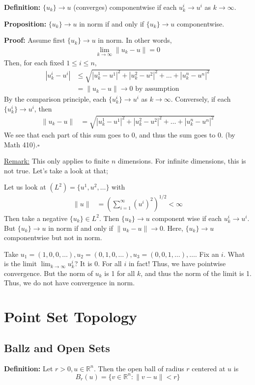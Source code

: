 \documentclass{article}
\newcommand*{\qed}{\hfill$\square$}%
\newcommand*{\txt}[1]{\text{ #1 }}%
\newcommand*{\rr}{\mathbb{R}}%
\begin{document}
\textbf{Definition:} $\{u_k\}\to u$ (converges) componentwise if each $u_k^i\to u^i$ as $k\to\infty$.

\textbf{Proposition:} $\{u_k\}\to u$ in norm if and only if $\{u_k\}\to u$ componentwise.

\textbf{Proof:} Assume first $\{u_k\}\to u$ in norm. In other words, \begin{align*}
    \lim_{k\to\infty}\|u_k-u\|=0
\end{align*}
Then, for each fixed $1\leq i\leq n$, \begin{align*}
    |u_k^i-u^i|&\leq\sqrt{|u_k^1-u^1|^2+|u_k^2-u^2|^2+\ldots+|u_k^n-u^n|^2} \\&= \|u_k-u\|\to 0\txt{by assumption}
\end{align*}
By the comparison principle, each $\{u_k^i\}\to u^i$ as $k\to\infty$. Conversely, if each $\{u_k^i\}\to u^i$, then \begin{align*}
    \|u_k-u\|&=\sqrt{|u_k^1-u^1|^2+|u_k^2-u^2|^2+\ldots+|u_k^n-u^n|^2}
\end{align*}
We see that each part of this sum goes to 0, and thus the sum goes to 0. (by Math 410).\qed

\underline{Remark:} This only applies to finite $n$ dimensions. For infinite dimensions, this is not true. Let's take a look at that;

Let us look at $(\mathit{L}^2)=\{u^1, u^2, \dots\}$ with \begin{align*}
    \|u\|&=(\sum_{i=1}^{\infty}(u^i)^2)^{1/2}<\infty
\end{align*}
Then take a negative $\{u_k\}\in \mathit{L}^2$. Then $\{u_k\}\to u$ component wise if each $u_k^i\to u^i$. But $\{u_k\}\to u$ in norm if and only if $\|u_k-u\|\to 0$. Here, $\{u_k\}\to u$ componentwise but not in norm.

Take $u_1=(1,0,0,\ldots), u_2=(0,1,0,\ldots), u_3=(0,0,1,\ldots), \ldots$. Fix an $i$. What is the limit $\lim_{k\to\infty}u_k^i$? It is 0. For all $i$ in fact! Thus, we have pointwise convergence. But the norm of $u_k$ is 1 for all $k$, and thus the norm of the limit is 1. Thus, we do not have convergence in norm.

\section{Point Set Topology}

\subsection{Ballz and Open Sets}
\textbf{Definition:} Let $r>0, u\in \rr^n$. Then the open ball of radius $r$ centered at $u$ is \[
    B_r(u)=\{v\in \rr^n:\|v-u\|<r\}
\]
\end{document}
